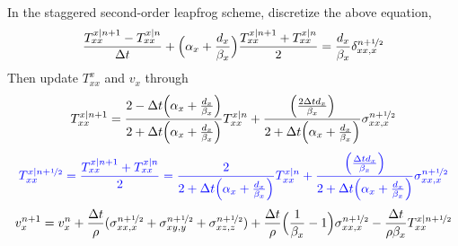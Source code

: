 \documentclass{article}
\newcommand{\myno}[1]{{\color{blue}#1}}
\begin{document}
In the staggered second-order leapfrog scheme, discretize the above equation,
\[ \frac{T_{xx}^{x|n+1}-T_{xx}^{x|n}}{\Delta t}+\Big(\alpha_x+\frac{d_x}{\beta_x}\Big)\frac{T_{xx}^{x|n+1}+T_{xx}^{x|n}}{2}=\frac{d_x}{\beta_x}\delta_{xx,x}^{n+\nicefrac{1}{2}} \]
Then update $T_{xx}^x$ and $v_x$ through
\[ T_{xx}^{x|n+1}=\frac{2-\Delta t\Big(\alpha_x+\frac{d_x}{\beta_x}\Big)}{2+\Delta t\Big(\alpha_x+\frac{d_x}{\beta_x}\Big)}T_{xx}^{x|n}+\frac{\Big(\frac{2\Delta td_x}{\beta_x}\Big)}{2+\Delta t\Big(\alpha_x+\frac{d_x}{\beta_x}\Big)}\sigma_{xx,x}^{n+\nicefrac{1}{2}} \]
\[ \myno{ T_{xx}^{x|n+\nicefrac{1}{2}}=\frac{T_{xx}^{x|n+1}+T_{xx}^{x|n}}{2}=\frac{2}{2+\Delta t\Big(\alpha_x+\frac{d_x}{\beta_x}\Big)}T_{xx}^{x|n}+\frac{\Big(\frac{\Delta td_x}{\beta_x}\Big)}{2+\Delta t\Big(\alpha_x+\frac{d_x}{\beta_x}\Big)}\sigma_{xx,x}^{n+\nicefrac{1}{2}} } \]
\[ v_x^{n+1}=v_x^n+\frac{\Delta t}{\rho}(\sigma_{xx,x}^{n+\nicefrac{1}{2}}+\sigma_{xy,y}^{n+\nicefrac{1}{2}}+\sigma_{xz,z}^{n+\nicefrac{1}{2}})+\frac{\Delta t}{\rho}\Big(\frac{1}{\beta_x}-1\Big)\sigma_{xx,x}^{n+\nicefrac{1}{2}}-\frac{\Delta t}{\rho\beta_x}T_{xx}^{x|n+\nicefrac{1}{2}} \]\par
\end{document}
